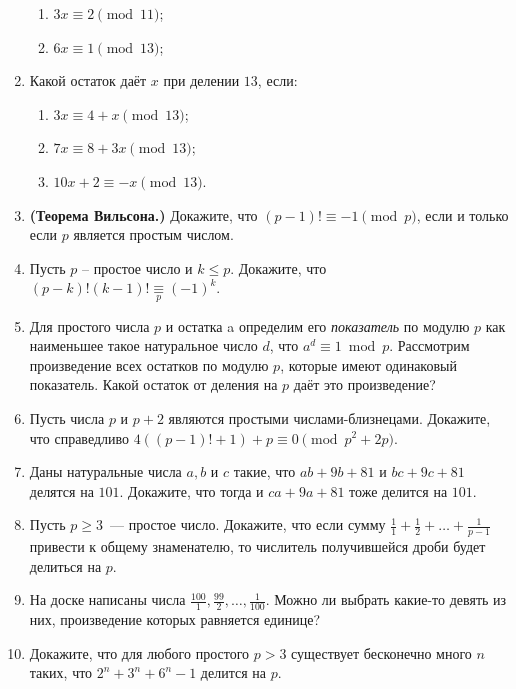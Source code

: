 \documentclass{article}
\begin{document}
\begin{enumerate}[label*=\protect\fbox{\arabic{enumi}}]
\begin{enumerate}
	\item $3x \equiv 2 \pmod {11}$;
	
	\item $6x \equiv 1 \pmod {13}$;
	
\end{enumerate}


\item Какой остаток даёт $x$ при делении $13$, если:
	\begin{enumerate}
	 	\item $3x \equiv 4 + x \pmod {13}$;
	 	
	 	\item $7x \equiv 8 + 3x \pmod {13}$;
	 	
	 	\item $10x + 2 \equiv -x \pmod {13}$. 
	\end{enumerate}
\item \textbf{(Теорема Вильсона.)} Докажите, что $(p-1)!\equiv -1\pmod p$, если и только если $p$ является простым числом.

\item Пусть $p$ -- простое число и $k \leqslant p$. Докажите, что $(p - k)!(k - 1)! \underset{p}{\equiv} (-1)^k$.

\item Для простого числа $p$ и остатка a определим его \textit{показатель} по модулю $p$ как наименьшее такое натуральное число $d$, что $a^d \equiv 1 \bmod p$. Рассмотрим произведение всех остатков по модулю $p$, которые имеют одинаковый показатель. Какой остаток от деления на $p$ даёт это произведение?


\item Пусть числа $p$ и $p + 2$ являются простыми числами-близнецами. Докажите, 
что справедливо $4((p - 1)! + 1) + p \equiv 0 \pmod{p^2+2p}$.

\item Даны натуральные числа $a, b$ и $c$ такие, что $ab+9b+81$ и $bc+9c+81$ делятся на $101$. Докажите, что тогда и $ca + 9a + 81$ тоже делится на $101$.


\item Пусть $p \geqslant 3$~--- простое число. Докажите, что если сумму $\frac{1}{1} + \frac{1}{2} + \ldots+\frac{1}{p-1}$ привести к общему знаменателю, то числитель получившейся дроби будет делиться на $p$.

\item  На доске написаны числа $\frac{100}{1}, \frac{99}{2}, \ldots, \frac{1}{100}$. Можно ли выбрать какие-то девять из них, произведение которых равняется единице?

\item Докажите, что для любого простого $p > 3$ существует бесконечно много $n$ таких, что $2^n +3^n +6^n -1$ делится на $p$.


\end{enumerate}
\end{document}
